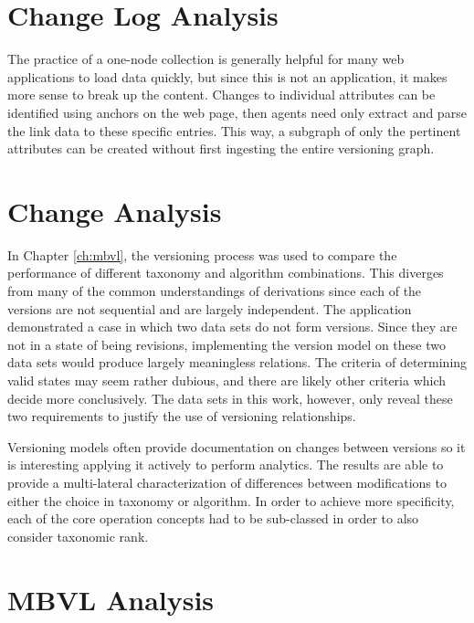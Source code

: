 \section{Change Log Analysis}

The practice of a one-node collection is generally helpful for many web applications to load data quickly, but since this is not an application, it makes more sense to break up the content.
Changes to individual attributes can be identified using anchors on the web page, then agents need only extract and parse the link data to these specific entries.
This way, a subgraph of only the pertinent attributes can be created without first ingesting the entire versioning graph.


\section{Change Analysis}

In Chapter \ref{ch:mbvl}, the versioning process was used to compare the performance of different taxonomy and algorithm combinations.
This diverges from many of the common understandings of derivations since each of the versions are not sequential and are largely independent.
The application demonstrated a case in which two data sets do not form versions.
Since they are not in a state of being revisions, implementing the version model on these two data sets would produce largely meaningless relations.
The criteria of determining valid states may seem rather dubious, and there are likely other criteria which decide more conclusively.
The data sets in this work, however, only reveal these two requirements to justify the use of versioning relationships. 

Versioning models often provide documentation on changes between versions so it is interesting applying it actively to perform analytics.
The results are able to provide a multi-lateral characterization of differences between modifications to either the choice in taxonomy or algorithm.
In order to achieve more specificity, each of the core operation concepts had to be sub-classed in order to also consider taxonomic rank.

\section{MBVL Analysis}

